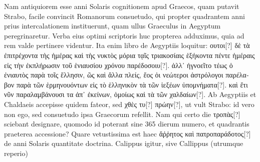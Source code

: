 Nam antiquiorem esse anni Solaris cognitionem
apud Graecos, quam putavit Strabo, facile convincit Romanorum
consuetudo, qui propter quadrantem anni prius intercalationem
instituerunt, quam ullus Graeculus in Aegyptum peregrinaretur.
Verba
eius optimi scriptoris huc propterea adduximus, quia ad rem valde
pertinere videntur.
Ita enim libro  de Aegyptiis loquitur:
 \textgreek{ουτοι[?] δὲ
τὰ ἐπιτρέχοντα τὴς ἡμέρας καὶ τὴς νυκτὸς μόρια τᾳῖς τριακοσίαις ἑξήκοντα πέντε
ἡμέραις εἰς τὴν ἐκπλήρωσιν τοῦ ἑνιαυσίου χρόνου παρέδοσοιυ[?]}.
\textgreek{ἀλλ᾽ ἠγνοεῖτο τέως
ὁ ἐνιαυτὸς παρὰ τοῖς ἕλλησιν, ῶς καὶ ἄλλα πλείς, ἕος ὁι νεώτεροι ἀστρόλογοι
παρέλαβον παρὰ τῶν ἑρμηνουόντων εἰς τὸ ἑλληνικὸν τὰ τῶν ἱεξέων ὑπομνήματα[?]}.
\textgreek{καὶ ἔτι νῦν παραλαμβάνουσι τα ἀπ᾽ ἐκείνων,
 ὁμοίως καὶ τὰ τῶν χαλδαίων[?]}.
Ab Aegyptiis
et Chaldaeis accepisse quidem fateor, sed \textgreek{χθὲς τυ[?] πρώην[?]},
 ut vult
Strabo: id vero non ego, sed consuetudo ipsa Graecorum refellit.
Nam
qui certo die \textgreek{τροπὰς[?]} sciebant designare,
 quomodo id poterant sine 365
dierum numero, et quadrantis praeterea accessione?
Quare vetustissima
est haec \textgreek{ἄῤῥητος καὶ πατροπαράδοτος[?]} de anni Solaris quantitate doctrina.
Calippus igitur, sive Callippus (utrumque reperio)
